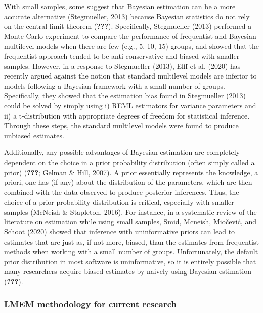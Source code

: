 \documentclass[
  english,
  man]{apa6}
\begin{document}
With small samples, some suggest that Bayesian estimation can be a more accurate alternative (Stegmueller, 2013) because Bayesian statistics do not rely on the central limit theorem ({\textbf{???}}). Specifically, Stegmueller (2013) performed a Monte Carlo experiment to compare the performance of frequentist and Bayesian multilevel models when there are few (e.g., 5, 10, 15) groups, and showed that the frequentist approach tended to be anti-conservative and biased with smaller samples. However, in a response to Stegmueller (2013), Elff et al. (2020) has recently argued against the notion that standard multilevel models are inferior to models following a Bayesian framework with a small number of groups. Specifically, they showed that the estimation bias found in Stegmueller (2013) could be solved by simply using i) REML estimators for variance parameters and ii) a t-distribution with appropriate degrees of freedom for statistical inference. Through these steps, the standard multilevel models were found to produce unbiased estimates.

Additionally, any possible advantages of Bayesian estimation are completely dependent on the choice in a prior probability distribution (often simply called a prior) ({\textbf{???}}; Gelman \& Hill, 2007). A prior essentially represents the knowledge, a priori, one has (if any) about the distribution of the parameters, which are then combined with the data observed to produce posterior inferences. Thus, the choice of a prior probability distribution is critical, especially with smaller samples (McNeish \& Stapleton, 2016). For instance, in a systematic review of the literature on estimation while using small samples, Smid, Mcneish, Miočević, and Schoot (2020) showed that inference with uninformative priors can lead to estimates that are just as, if not more, biased, than the estimates from frequentist methods when working with a small number of groups. Unfortunately, the default prior distribution in most software is uninformative, so it is entirely possible that many researchers acquire biased estimates by naively using Bayesian estimation ({\textbf{???}}).

\hypertarget{lmem-methodology-for-current-research}{%
\subsubsection{LMEM methodology for current research}\label{lmem-methodology-for-current-research}}
\end{document}
